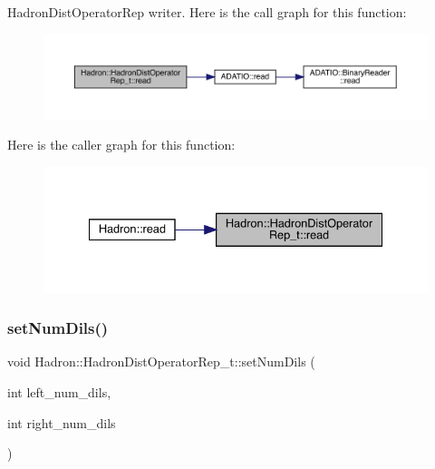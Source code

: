 Hadron\+Dist\+Operator\+Rep writer. Here is the call graph for this function\+:\nopagebreak
\begin{figure}[H]
\begin{center}
\leavevmode
\includegraphics[width=350pt]{dd/de0/classHadron_1_1HadronDistOperatorRep__t_a17387b2569f243bf0aecc9c6f4160051_cgraph}
\end{center}
\end{figure}
Here is the caller graph for this function\+:\nopagebreak
\begin{figure}[H]
\begin{center}
\leavevmode
\includegraphics[width=334pt]{dd/de0/classHadron_1_1HadronDistOperatorRep__t_a17387b2569f243bf0aecc9c6f4160051_icgraph}
\end{center}
\end{figure}
\mbox{\label{classHadron_1_1HadronDistOperatorRep__t_adde38342364887f39b718d5ab981cd1e}} 
\subsubsection{\texorpdfstring{setNumDils()}{setNumDils()}\hspace{0.1cm}{\footnotesize\ttfamily [1/3]}}
{\footnotesize\ttfamily void Hadron\+::\+Hadron\+Dist\+Operator\+Rep\+\_\+t\+::set\+Num\+Dils (\begin{DoxyParamCaption}\item[{int}]{left\+\_\+num\+\_\+dils,  }\item[{int}]{right\+\_\+num\+\_\+dils }\end{DoxyParamCaption})}



